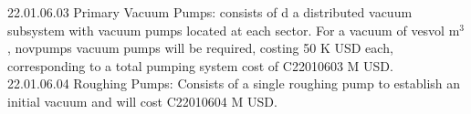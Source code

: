 



22.01.06.03 Primary Vacuum Pumps: consists of d a distributed vacuum subsystem with vacuum pumps located at each sector. For a vacuum of vesvol m$^3$, novpumps vacuum pumps will be required, costing 50 K USD each, corresponding to a total pumping system cost of C22010603 M USD.\\

22.01.06.04 Roughing Pumps: Consists of a single roughing pump to establish an initial vacuum and will cost C22010604 M USD.

